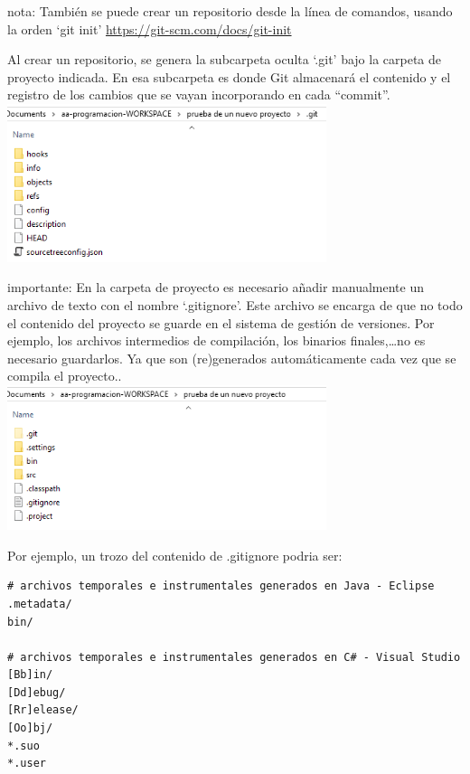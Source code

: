 \documentclass[spanish,12pt,a4paper,final,oneside]{book}
\begin{document}
nota: También se puede crear un repositorio desde la línea de comandos, usando la orden `git init' \url{https://git-scm.com/docs/git-init}

Al crear un repositorio, se genera la subcarpeta oculta `.git' bajo la carpeta de proyecto indicada. En esa subcarpeta es donde Git almacenará el contenido y el registro de los cambios que se vayan incorporando en cada ``commit''.
\\ \includegraphics[width=0.7\textwidth]{Sourcetree - contenido de la subcarpeta git}

importante: En la carpeta de proyecto es necesario añadir manualmente un archivo de texto con el nombre `.gitignore'. Este archivo se encarga de que no todo el contenido del proyecto se guarde en el sistema de gestión de versiones. Por ejemplo, los archivos intermedios de compilación, los binarios finales,\ldots no es necesario guardarlos. Ya que son (re)generados automáticamente cada vez que se compila el proyecto..
\\ \includegraphics[width=0.7\textwidth]{Sourcetree - contenido de la carpeta con codigo}

Por ejemplo, un trozo del contenido de .gitignore podria ser:
\begin{scriptsize}
\begin{verbatim}
# archivos temporales e instrumentales generados en Java - Eclipse
.metadata/
bin/

# archivos temporales e instrumentales generados en C# - Visual Studio
[Bb]in/
[Dd]ebug/
[Rr]elease/
[Oo]bj/
*.suo
*.user
\end{verbatim}
\end{scriptsize}
\end{document}
